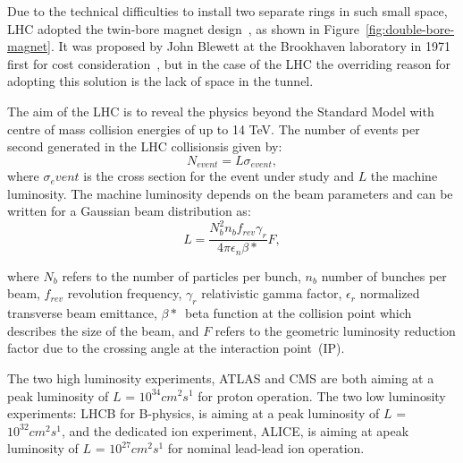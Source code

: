 	Due to the technical difficulties to install 
	two separate rings in such small space,
	LHC adopted the twin-bore magnet design~\cite{rossi2003lhc}, 
	as shown in Figure~\ref{fig:double-bore-magnet}.
	It was proposed by John Blewett at the Brookhaven 
	laboratory in 1971 first for
	cost consideration~\cite{Blewett:1971zzb},
	but in the case of the LHC the overriding reason for adopting this solution
	is the lack of space in the tunnel. 

	The aim of the LHC is to reveal the physics beyond
	the Standard Model with centre of mass 
	collision energies of up to 14 TeV.
	The number of events per second generated in the LHC collisionsis given by:
	\[
		N_{event} = L\sigma_{event},\]
	where $\sigma_event$ is the cross section 
	for the event under study and $L$ the machine luminosity. 
	The machine luminosity depends on the beam parameters 
	and can be written for a Gaussian beam distribution as:
	\[
	L = \frac{N_b^2 n_b f_{rev} \gamma_r}{4\pi \epsilon_n \beta*} F,
	\]

	where $N_b$ refers to the number of particles per bunch,
	$n_b$ number of bunches per beam,
	$f_{rev}$ revolution frequency, 
	$\gamma_r$ relativistic gamma factor, 
	$\epsilon_r$ normalized transverse beam emittance, 
	$\beta*$~beta function at the collision point which
	describes the size of the beam, 
	and	$F$ refers to the geometric luminosity reduction factor due to the 
	crossing angle at the interaction point~(IP).

	The two high luminosity experiments, ATLAS and CMS are
	both aiming at a peak luminosity of $L$ = $10^{34}cm^2s^1$ for proton operation.
	The two low luminosity experiments: LHCB for 
	B-physics, is aiming at a peak luminosity of $L$ = $10^{32}cm^2s^1$, 
	and the dedicated ion experiment, ALICE, is aiming at apeak luminosity of
	$L$ = $10^{27}cm^2s^1$ for nominal lead-lead ion operation.


